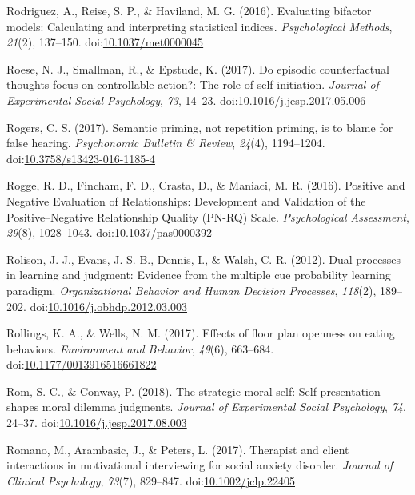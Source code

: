 \documentclass[english,man]{apa6}
\theoremstyle{definition}
\theoremstyle{definition}
\theoremstyle{definition}
\theoremstyle{remark}
\begin{document}
\hypertarget{ref-Rodriguez2016}{}
Rodriguez, A., Reise, S. P., \& Haviland, M. G. (2016). Evaluating
bifactor models: Calculating and interpreting statistical indices.
\emph{Psychological Methods}, \emph{21}(2), 137--150.
doi:\href{https://doi.org/10.1037/met0000045}{10.1037/met0000045}

\hypertarget{ref-Roese2017}{}
Roese, N. J., Smallman, R., \& Epstude, K. (2017). Do episodic
counterfactual thoughts focus on controllable action?: The role of
self-initiation. \emph{Journal of Experimental Social Psychology},
\emph{73}, 14--23.
doi:\href{https://doi.org/10.1016/j.jesp.2017.05.006}{10.1016/j.jesp.2017.05.006}

\hypertarget{ref-Rogers2016}{}
Rogers, C. S. (2017). Semantic priming, not repetition priming, is to
blame for false hearing. \emph{Psychonomic Bulletin \& Review},
\emph{24}(4), 1194--1204.
doi:\href{https://doi.org/10.3758/s13423-016-1185-4}{10.3758/s13423-016-1185-4}

\hypertarget{ref-Rogge2017}{}
Rogge, R. D., Fincham, F. D., Crasta, D., \& Maniaci, M. R. (2016).
Positive and Negative Evaluation of Relationships: Development and
Validation of the Positive--Negative Relationship Quality (PN-RQ) Scale.
\emph{Psychological Assessment}, \emph{29}(8), 1028--1043.
doi:\href{https://doi.org/10.1037/pas0000392}{10.1037/pas0000392}

\hypertarget{ref-Rolison2012}{}
Rolison, J. J., Evans, J. S. B., Dennis, I., \& Walsh, C. R. (2012).
Dual-processes in learning and judgment: Evidence from the multiple cue
probability learning paradigm. \emph{Organizational Behavior and Human
Decision Processes}, \emph{118}(2), 189--202.
doi:\href{https://doi.org/10.1016/j.obhdp.2012.03.003}{10.1016/j.obhdp.2012.03.003}

\hypertarget{ref-Rollings2017}{}
Rollings, K. A., \& Wells, N. M. (2017). Effects of floor plan openness
on eating behaviors. \emph{Environment and Behavior}, \emph{49}(6),
663--684.
doi:\href{https://doi.org/10.1177/0013916516661822}{10.1177/0013916516661822}

\hypertarget{ref-Rom2018}{}
Rom, S. C., \& Conway, P. (2018). The strategic moral self:
Self-presentation shapes moral dilemma judgments. \emph{Journal of
Experimental Social Psychology}, \emph{74}, 24--37.
doi:\href{https://doi.org/10.1016/j.jesp.2017.08.003}{10.1016/j.jesp.2017.08.003}

\hypertarget{ref-Romano2017}{}
Romano, M., Arambasic, J., \& Peters, L. (2017). Therapist and client
interactions in motivational interviewing for social anxiety disorder.
\emph{Journal of Clinical Psychology}, \emph{73}(7), 829--847.
doi:\href{https://doi.org/10.1002/jclp.22405}{10.1002/jclp.22405}
\end{document}
